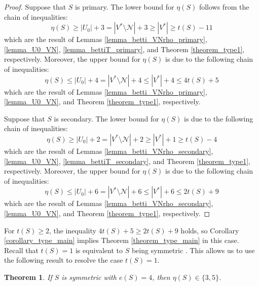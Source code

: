 \documentclass[12pt]{article}
\newtheorem{thm}{Theorem}[section]
\theoremstyle{remark}
\begin{document}
\begin{proof}
    Suppose that $S$ is primary. The lower bound for $\eta(S)$ follows from the chain of inequalities:
    \begin{equation}
        \eta(S) \geq |U_0| + 3 = |V^* \setminus \mathcal{N}| + 3 \geq |V^*|  \geq t(S) - 11
    \end{equation}
     which are the result of Lemmas \ref{lemma_betti_VNrho_primary}, \ref{lemma_U0_VN}, \ref{lemma_bettiT_primary}, and Theorem \ref{theorem_type1}, respectively. Moreover, the upper bound for $\eta(S)$ is due to the following chain of inequalities:
    \begin{equation}
        \eta(S) \leq |U_0| + 4 = |V^* \setminus \mathcal{N}| + 4 \leq |V^*| +4 \leq 4t(S) +5
    \end{equation}
     which are the result of Lemmas \ref{lemma_betti_VNrho_primary}, \ref{lemma_U0_VN}, and Theorem \ref{theorem_type1}, respectively.

     Suppose that $S$ is secondary. The lower bound for $\eta(S)$ is due to the following chain of inequalities:
    \begin{equation}
        \eta(S) \geq |U_0| + 2 = |V^* \setminus \mathcal{N}| + 2 \geq |V^*| +1 \geq t(S) - 4
    \end{equation}
     which are the result of Lemmas \ref{lemma_betti_VNrho_secondary}, \ref{lemma_U0_VN}, \ref{lemma_bettiT_secondary}, and Theorem \ref{theorem_type1}, respectively. Moreover, the upper bound for $\eta(S)$ is due to the following chain of inequalities:
    \begin{equation}
        \eta(S) \leq |U_0| + 6 = |V^* \setminus \mathcal{N}| + 6 \leq |V^*| +6 \leq 2t(S) +9
    \end{equation}
     which are the result of Lemmas \ref{lemma_betti_VNrho_secondary}, \ref{lemma_U0_VN}, and Theorem \ref{theorem_type1}, respectively. 
\end{proof}


For $t(S) \geq 2$, the inequality $4t(S) +5 \geq 2 t(S) + 9$ holds, so Corollary \ref{corollary_type_main} implies Theorem \ref{theorem_type_main} in this case. Recall that $t(S) = 1$ is equivalent to $S$ being symmetric \cite{Kunz1970}. This allows us to use the following result to resolve the case $t(S) = 1$. 


\begin{thm}
    \textup{\cite{Bresinsky1975sym}} If $S$ is symmetric with $e(S)=4$, then $\eta(S) \in \{3,5\}$.
\end{thm}
\end{document}
